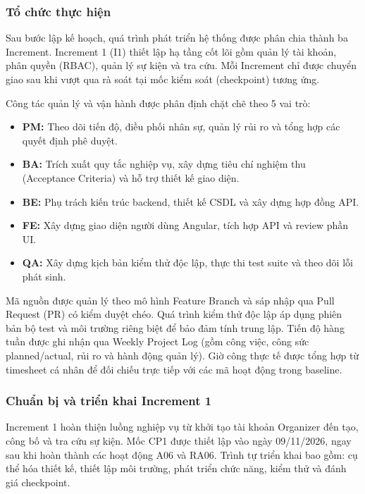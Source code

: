 \subsubsection{Tổ chức thực hiện}
\label{sec:i1-organization}

Sau bước lập kế hoạch, quá trình phát triển hệ thống được phân chia thành ba Increment. Increment 1 (I1) thiết lập hạ tầng cốt lõi gồm quản lý tài khoản, phân quyền (RBAC), quản lý sự kiện và tra cứu. Mỗi Increment chỉ được chuyển giao sau khi vượt qua rà soát tại mốc kiểm soát (checkpoint) tương ứng.


Công tác quản lý và vận hành được phân định chặt chẽ theo 5 vai trò:
\begin{itemize}
    \item \textbf{PM:} Theo dõi tiến độ, điều phối nhân sự, quản lý rủi ro và tổng hợp các quyết định phê duyệt.
    \item \textbf{BA:} Trích xuất quy tắc nghiệp vụ, xây dựng tiêu chí nghiệm thu (Acceptance Criteria) và hỗ trợ thiết kế giao diện.
    \item \textbf{BE:} Phụ trách kiến trúc backend, thiết kế CSDL và xây dựng hợp đồng API.
    \item \textbf{FE:} Xây dựng giao diện người dùng Angular, tích hợp API và review phần UI.
    \item \textbf{QA:} Xây dựng kịch bản kiểm thử độc lập, thực thi test suite và theo dõi lỗi phát sinh.
\end{itemize}

Mã nguồn được quản lý theo mô hình Feature Branch và sáp nhập qua Pull Request (PR) có kiểm duyệt chéo. Quá trình kiểm thử độc lập áp dụng phiên bản bộ test và môi trường riêng biệt để bảo đảm tính trung lập. Tiến độ hàng tuần được ghi nhận qua Weekly Project Log (gồm công việc, công sức planned/actual, rủi ro và hành động quản lý). Giờ công thực tế được tổng hợp từ timesheet cá nhân để đối chiếu trực tiếp với các mã hoạt động trong baseline.

\subsubsection{Chuẩn bị và triển khai Increment 1}
\label{sec:i1-development}

Increment 1 hoàn thiện luồng nghiệp vụ từ khởi tạo tài khoản Organizer đến tạo, công bố và tra cứu sự kiện. Mốc CP1 được thiết lập vào ngày 09/11/2026, ngay sau khi hoàn thành các hoạt động A06 và RA06. Trình tự triển khai bao gồm: cụ thể hóa thiết kế, thiết lập môi trường, phát triển chức năng, kiểm thử và đánh giá checkpoint.

